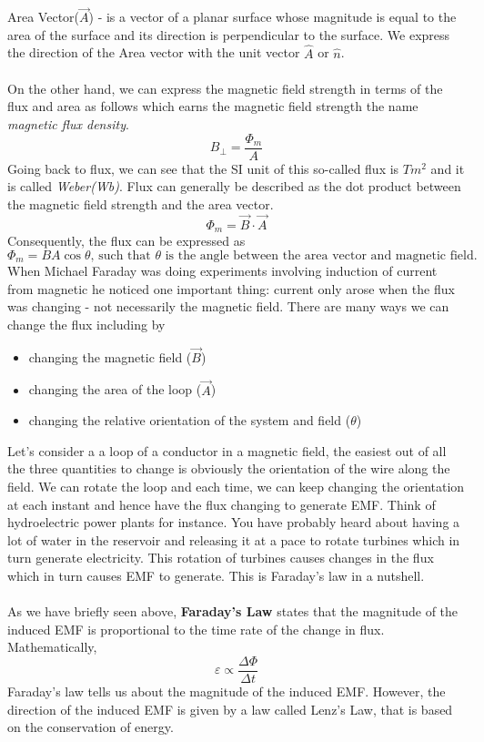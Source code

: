 \documentclass[9pt]{article}
\begin{document}
	Area Vector($\vec{A}$) - is a vector of a planar surface whose magnitude is equal to the area of the surface and its direction is perpendicular to the surface. We express the direction of the Area vector with the unit vector $\hat{A}$ or $\hat{n}$. \\ \\
	On the other hand, we can express the magnetic field strength in terms of the flux and area as follows which earns the magnetic field strength the name \textit{magnetic flux density}.
	$$B_\perp=\dfrac{\Phi_m}{A}$$
	Going back to flux, we can see that the SI unit of this so-called flux is $Tm^2$ and it is called \textit{Weber(Wb)}. Flux can generally be described as the dot product between the magnetic field strength and the area vector.
	$$\Phi_m=\vec{B}\cdot\vec{A}$$
	Consequently, the flux can be expressed as
	$$\Phi_m=BA\cos\theta\text{, such that }\theta\text{ is the angle between the area vector and magnetic field.}$$
	When Michael Faraday was doing experiments involving induction of current from magnetic he noticed one important thing: current only arose when the flux was changing - not necessarily the magnetic field. There are many ways we can change the flux including by
	\begin{itemize}
		\item changing the magnetic field ($\vec{B}$)
		\item changing the area of the loop ($\vec{A}$)
		\item changing the relative orientation of the system and field ($\theta$)
	\end{itemize}
	Let's consider a a loop of a conductor in a magnetic field, the easiest out of all the three quantities to change is obviously the orientation of the wire along the field. We can rotate the loop and each time, we can keep changing the orientation at each instant and hence have the flux changing to generate EMF. Think of hydroelectric power plants for instance. You have probably heard about having a lot of water in the reservoir and releasing it at a pace to rotate turbines which in turn generate electricity. This rotation of turbines causes changes in the flux which in turn causes EMF to generate. This is Faraday's law in a nutshell.\\ \\
	As we have briefly seen above, \textbf{Faraday's Law} states that the magnitude of the induced EMF is proportional to the time rate of the change in flux. Mathematically,
	$$\varepsilon\propto\dfrac{\Delta\Phi}{\Delta t}$$
	Faraday's law tells us about the magnitude of the induced EMF. However, the direction of the induced EMF is given by a law called Lenz's Law, that is based on the conservation of energy.
\end{document}

